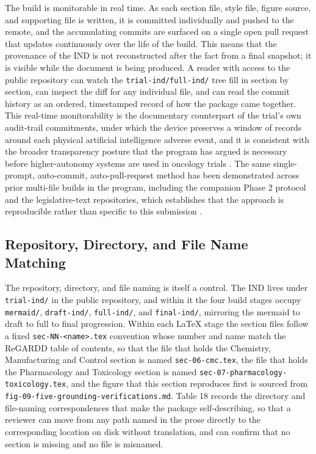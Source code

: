 The build is monitorable in real time. As each section file, style file, figure
source, and supporting file is written, it is committed individually and pushed to
the remote, and the accumulating commits are surfaced on a single open pull request
that updates continuously over the life of the build. This means that the
provenance of the IND is not reconstructed after the fact from a final snapshot;
it is visible while the document is being produced. A reader with access to the
public repository can watch the \texttt{trial-ind/full-ind/} tree fill in section
by section, can inspect the diff for any individual file, and can read the commit
history as an ordered, timestamped record of how the package came together. This
real-time monitorability is the documentary counterpart of the trial's own
audit-trail commitments, under which the device preserves a window of records
around each physical artificial intelligence adverse event, and it is consistent
with the broader transparency posture that the program has argued is necessary
before higher-autonomy systems are used in oncology trials \cite{congress9510,
clintrustpai, natlpaiplatf}. The same single-prompt, auto-commit, auto-pull-request
method has been demonstrated across prior multi-file builds in the program,
including the companion Phase 2 protocol and the legislative-text repositories,
which establishes that the approach is reproducible rather than specific to this
submission \cite{oncotrialllm, paipredict4x}.

\subsection{Repository, Directory, and File Name Matching}

The repository, directory, and file naming is itself a control. The IND lives under
\texttt{trial-ind/} in the public repository, and within it the four build stages
occupy \texttt{mermaid/}, \texttt{draft-ind/}, \texttt{full-ind/}, and
\texttt{final-ind/}, mirroring the mermaid to draft to full to final progression.
Within each LaTeX stage the section files follow a fixed
\texttt{sec-NN-<name>.tex} convention whose number and name match the ReGARDD table
of contents, so that the file that holds the Chemistry, Manufacturing and Control
section is named \texttt{sec-06-cmc.tex}, the file that holds the Pharmacology and
Toxicology section is named \texttt{sec-07-pharmacology-toxicology.tex}, and the
figure that this section reproduces first is sourced from
\texttt{fig-09-five-grounding-verifications.md}. Table 18 records the directory and
file-naming correspondences that make the package self-describing, so that a
reviewer can move from any path named in the prose directly to the corresponding
location on disk without translation, and can confirm that no section is missing
and no file is misnamed.


